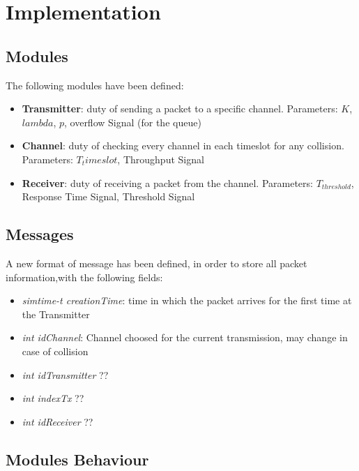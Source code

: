 \section{Implementation}
\subsection{Modules}
The following modules have been defined:
\begin{itemize}
	\item \textbf{Transmitter}: duty of sending a packet to a specific channel. Parameters: $K$, $lambda$, $p$, overflow Signal (for the queue)
	\item \textbf{Channel}: duty of checking every channel in each timeslot for any collision. Parameters: $T_timeslot$, Throughput Signal
	\item \textbf{Receiver}: duty of receiving a packet from the channel. Parameters: $T_{threshold}$, Response Time Signal, Threshold Signal
\end{itemize}
\subsection{Messages}
A new format of message has been defined, in order to store all packet information,with the following fields:
\begin{itemize}
	\item \textit{simtime-t creationTime}: time in which the packet arrives for the first time at the Transmitter
	\item \textit{int idChannel}: Channel choosed for the current transmission, may change in case of collision
	\item \textit{int idTransmitter} ??
	\item \textit{int indexTx} ??
	\item \textit{int idReceiver} ??
\end{itemize}

\subsection{Modules Behaviour}
